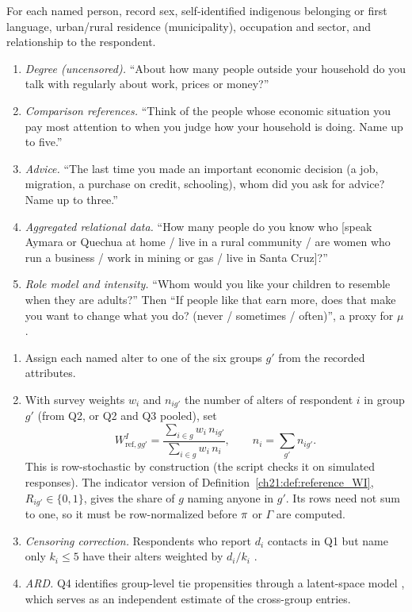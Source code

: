 \documentclass[../solutions_manual.tex]{subfiles}
\begin{document}
 For each named person, record sex, self-identified indigenous belonging or first language, urban/rural residence (municipality), occupation and sector, and relationship to the respondent.
\begin{enumerate}
\item \emph{Degree (uncensored).} ``About how many people outside your household do you talk with regularly about work, prices or money?''
\item \emph{Comparison references.} ``Think of the people whose economic situation you pay most attention to when you judge how your household is doing. Name up to five.''
\item \emph{Advice.} ``The last time you made an important economic decision (a job, migration, a purchase on credit, schooling), whom did you ask for advice? Name up to three.''
\item \emph{Aggregated relational data.} ``How many people do you know who [speak Aymara or Quechua at home / live in a rural community / are women who run a business / work in mining or gas / live in Santa Cruz]?''
\item \emph{Role model and intensity.} ``Whom would you like your children to resemble when they are adults?'' Then ``If people like that earn more, does that make you want to change what you do? (never / sometimes / often)'', a proxy for $\mu$.
\end{enumerate}

\begin{enumerate}
\item Assign each named alter to one of the six groups $g'$ from the recorded attributes.
\item With survey weights $w_i$ and $n_{ig'}$ the number of alters of respondent $i$ in group $g'$ (from Q2, or Q2 and Q3 pooled), set
\[
W^I_{\text{ref},gg'} = \frac{\sum_{i\in g} w_i\, n_{ig'}}{\sum_{i\in g} w_i\, n_i}, \qquad n_i = \sum_{g'} n_{ig'}.
\]
This is row-stochastic by construction (the script checks it on simulated responses). The indicator version of Definition~\ref{ch21:def:reference_WI}, $R_{ig'} \in \{0,1\}$, gives the share of $g$ naming anyone in $g'$. Its rows need not sum to one, so it must be row-normalized before $\pi$ or $\Gamma$ are computed.
\item \emph{Censoring correction.} Respondents who report $d_i$ contacts in Q1 but name only $k_i \le 5$ have their alters weighted by $d_i/k_i$ \citep{griffith2022name}.
\item \emph{ARD.} Q4 identifies group-level tie propensities through a latent-space model \citep{breza2020using}, which serves as an independent estimate of the cross-group entries.
\end{enumerate}
\end{document}
